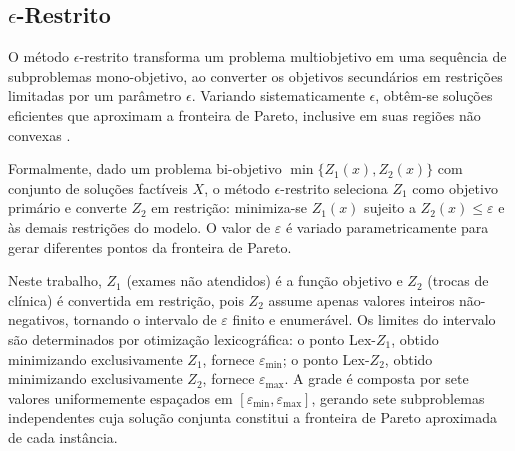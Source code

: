 \subsection{\texorpdfstring{$\epsilon$}{epsilon}-Restrito}
\label{subsec:eps-restrito-model}

O método $\epsilon$-restrito \cite{Haimes_Wismer_1971} transforma um problema multiobjetivo em uma sequência de subproblemas mono-objetivo, ao converter os objetivos secundários em restrições limitadas por um parâmetro $\epsilon$. Variando sistematicamente $\epsilon$, obtêm-se soluções eficientes que aproximam a fronteira de Pareto, inclusive em suas regiões não convexas \cite{Saez-Aguado_Trandafir_2018}.

Formalmente, dado um problema bi-objetivo $\min\{Z_1(x), Z_2(x)\}$ com conjunto de soluções factíveis $X$, o método $\epsilon$-restrito seleciona $Z_1$ como objetivo primário e converte $Z_2$ em restrição: minimiza-se $Z_1(x)$ sujeito a $Z_2(x) \leq \varepsilon$ e às demais restrições do modelo. O valor de $\varepsilon$ é variado parametricamente para gerar diferentes pontos da fronteira de Pareto.

Neste trabalho, $Z_1$ (exames não atendidos) é a função objetivo e $Z_2$ (trocas de clínica) é convertida em restrição, pois $Z_2$ assume apenas valores inteiros não-negativos, tornando o intervalo de $\varepsilon$ finito e enumerável. Os limites do intervalo são determinados por otimização lexicográfica: o ponto Lex-$Z_1$, obtido minimizando exclusivamente $Z_1$, fornece $\varepsilon_{\min}$; o ponto Lex-$Z_2$, obtido minimizando exclusivamente $Z_2$, fornece $\varepsilon_{\max}$. A grade é composta por sete valores uniformemente espaçados em $[\varepsilon_{\min}, \varepsilon_{\max}]$, gerando sete subproblemas independentes cuja solução conjunta constitui a fronteira de Pareto aproximada de cada instância.

